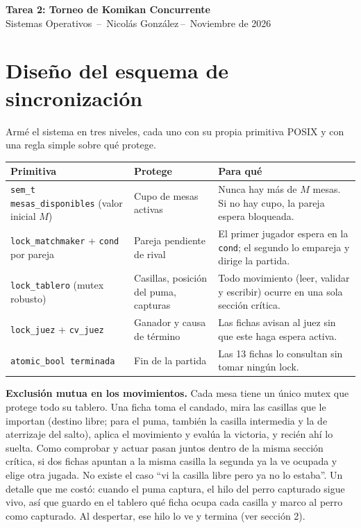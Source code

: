 \documentclass[11pt,a4paper]{article}
\newcommand{\integrantes}{Nicolás González}
\newcommand{\fecha}{Noviembre de 2026}
\newcommand{\cod}[1]{\texttt{\small #1}}
\begin{document}
\begin{center}
{\Large\bfseries Tarea 2: Torneo de Komikan Concurrente}\\[2pt]
Sistemas Operativos \,--\, \integrantes \,--\, \fecha
\end{center}
\vspace{-6pt}

\section{Diseño del esquema de sincronización}

Armé el sistema en tres niveles, cada uno con su propia primitiva POSIX y con una regla simple sobre qué protege.

\begin{center}
\small
\begin{tabular}{@{}>{\raggedright\arraybackslash}p{3.8cm}>{\raggedright\arraybackslash}p{4.2cm}>{\raggedright\arraybackslash}p{8.2cm}@{}}
\toprule
\textbf{Primitiva} & \textbf{Protege} & \textbf{Para qué} \\
\midrule
\cod{sem\_t mesas\_disponibles} (valor inicial $M$) & Cupo de mesas activas & Nunca hay más de $M$ mesas. Si no hay cupo, la pareja espera bloqueada. \\
\cod{lock\_matchmaker} + \cod{cond} por pareja & Pareja pendiente de rival & El primer jugador espera en la \cod{cond}; el segundo lo empareja y dirige la partida. \\
\cod{lock\_tablero} (mutex robusto) & Casillas, posición del puma, capturas & Todo movimiento (leer, validar y escribir) ocurre en una sola sección crítica. \\
\cod{lock\_juez} + \cod{cv\_juez} & Ganador y causa de término & Las fichas avisan al juez sin que este haga espera activa. \\
\cod{atomic\_bool terminada} & Fin de la partida & Las 13 fichas lo consultan sin tomar ningún lock. \\
\bottomrule
\end{tabular}
\end{center}

\textbf{Exclusión mutua en los movimientos.} Cada mesa tiene un único mutex que protege todo su tablero. Una ficha toma el candado, mira las casillas que le importan (destino libre; para el puma, también la casilla intermedia y la de aterrizaje del salto), aplica el movimiento y evalúa la victoria, y recién ahí lo suelta. Como comprobar y actuar pasan juntos dentro de la misma sección crítica, si dos fichas apuntan a la misma casilla la segunda ya la ve ocupada y elige otra jugada. No existe el caso ``vi la casilla libre pero ya no lo estaba''. Un detalle que me costó: cuando el puma captura, el hilo del perro capturado sigue vivo, así que guardo en el tablero qué ficha ocupa cada casilla y marco al perro como capturado. Al despertar, ese hilo lo ve y termina (ver sección 2).
\end{document}
